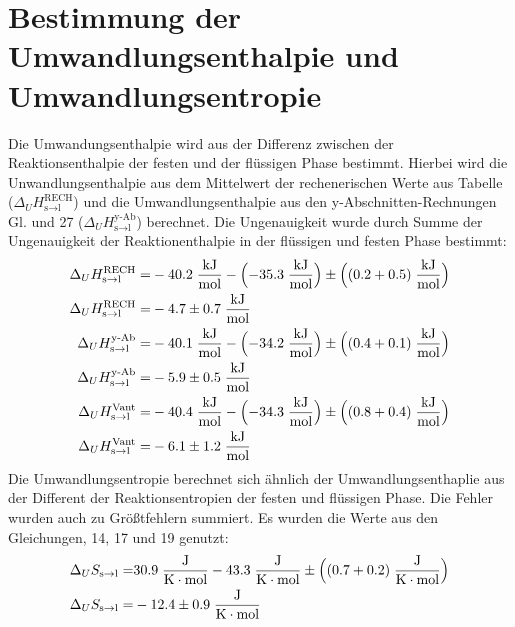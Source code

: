 \documentclass[12pt,a4paper,titlepage,headinclude,bibtotoc]{scrartcl}
\begin{document}
\section{Bestimmung der Umwandlungsenthalpie und Umwandlungsentropie}
Die Umwandungsenthalpie wird aus der Differenz zwischen der Reaktionsenthalpie der festen und der flüssigen Phase bestimmt. Hierbei wird die Unwandlungsenthalpie aus dem Mittelwert der rechenerischen Werte aus Tabelle ($\Delta_U H_{\text{s}\rightarrow\text{l}}^{\text{RECH}}$) und die Umwandlungsenthalpie aus den y-Abschnitten-Rechnungen Gl. und 27 ($\Delta_U H_{\text{s}\rightarrow\text{l}}^{\text{y-Ab}}$) berechnet. Die Ungenauigkeit wurde durch Summe der Ungenauigkeit der Reaktionenthalpie in der flüssigen und festen Phase bestimmt:
\begin{align}
\Delta_U H_{\text{s}\rightarrow\text{l}}^{\text{RECH}}=&  -40.2\;\frac{\text{kJ}}{\text{mol}} - \Bigl(-35.3\;\frac{\text{kJ}}{\text{mol}}\Bigr) \pm \Bigl((0.2+0.5)\;\frac{\text{kJ}}{\text{mol}}\Bigr)\\
\Delta_U H_{\text{s}\rightarrow\text{l}}^{\text{RECH}}=& -4.7\pm 0.7 \;\frac{\text{kJ}}{\text{mol}}\\
\Delta_U H_{\text{s}\rightarrow\text{l}}^{\text{y-Ab}}=&  -40.1\;\frac{\text{kJ}}{\text{mol}} - \Bigl(-34.2\;\frac{\text{kJ}}{\text{mol}}\Bigr) \pm \Bigl((0.4+0.1)\;\frac{\text{kJ}}{\text{mol}}\Bigr)\\
\Delta_U H_{\text{s}\rightarrow\text{l}}^{\text{y-Ab}}=& -5.9 \pm 0.5 \;\frac{\text{kJ}}{\text{mol}}\\
\Delta_U H_{\text{s}\rightarrow\text{l}}^{\text{Vant}}=&  -40.4\;\frac{\text{kJ}}{\text{mol}} - \Bigl(-34.3\;\frac{\text{kJ}}{\text{mol}}\Bigr) \pm \Bigl((0.8+0.4)\;\frac{\text{kJ}}{\text{mol}}\Bigr)\\
\Delta_U H_{\text{s}\rightarrow\text{l}}^{\text{Vant}}=& -6.1 \pm 1.2 \;\frac{\text{kJ}}{\text{mol}}
\end{align}
Die Umwandlungsentropie berechnet sich ähnlich der Umwandlungsenthaplie aus der Different der Reaktionsentropien der festen und flüssigen Phase. Die Fehler wurden auch zu Größtfehlern summiert. Es wurden die Werte aus den Gleichungen, 14, 17 und 19 genutzt:
\begin{align}
\Delta_U S_{\text{s}\rightarrow\text{l}}=&  30.9\;\frac{\text{J}}{\text{K}\cdot\text{mol}} - 43.3\;\frac{\text{J}}{\text{K}\cdot\text{mol}} \pm \Bigl((0.7+0.2)\;\frac{\text{J}}{\text{K}\cdot\text{mol}}\Bigr)\\
\Delta_U S_{\text{s}\rightarrow\text{l}}=& -12.4\pm0.9 \;\frac{\text{J}}{\text{K}\cdot\text{mol}}
\end{align}
\end{document}
